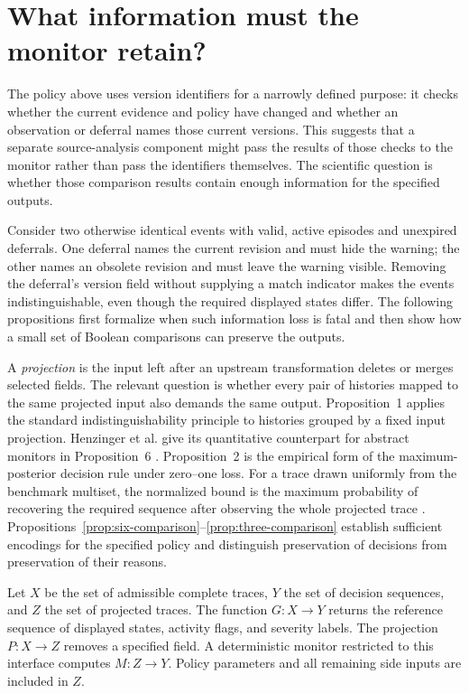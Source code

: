 \documentclass[preprint,11pt]{elsarticle}
\begin{document}
\section{What information must the monitor retain?}\label{sec:information}
The policy above uses version identifiers for a narrowly defined purpose: it checks whether the current evidence and policy have changed and whether an observation or deferral names those current versions. This suggests that a separate source-analysis component might pass the results of those checks to the monitor rather than pass the identifiers themselves. The scientific question is whether those comparison results contain enough information for the specified outputs.

Consider two otherwise identical events with valid, active episodes and unexpired deferrals. One deferral names the current revision and must hide the warning; the other names an obsolete revision and must leave the warning visible. Removing the deferral's version field without supplying a match indicator makes the events indistinguishable, even though the required displayed states differ. The following propositions first formalize when such information loss is fatal and then show how a small set of Boolean comparisons can preserve the outputs.

A \emph{projection} is the input left after an upstream transformation deletes or merges selected fields. The relevant question is whether every pair of histories mapped to the same projected input also demands the same output. Proposition~1 applies the standard indistinguishability principle to histories grouped by a fixed input projection. Henzinger et al. give its quantitative counterpart for abstract monitors in Proposition~6 \cite{henzinger2022abstract}. Proposition~2 is the empirical form of the maximum-posterior decision rule under zero--one loss. For a trace drawn uniformly from the benchmark multiset, the normalized bound is the maximum probability of recovering the required sequence after observing the whole projected trace \cite[Definition~3]{smith2009foundations}. Propositions~\ref{prop:six-comparison}--\ref{prop:three-comparison} establish sufficient encodings for the specified policy and distinguish preservation of decisions from preservation of their reasons.

Let $X$ be the set of admissible complete traces, $Y$ the set of decision sequences, and $Z$ the set of projected traces. The function $G:X\rightarrow Y$ returns the reference sequence of displayed states, activity flags, and severity labels. The projection $P:X\rightarrow Z$ removes a specified field. A deterministic monitor restricted to this interface computes $M:Z\rightarrow Y$. Policy parameters and all remaining side inputs are included in $Z$.
\end{document}
